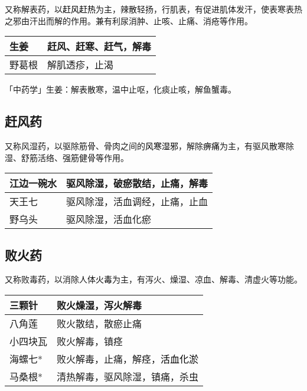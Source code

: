 \documentclass[cn,black,12pt,normal,founder]{elegantnote}
\newcommand{\redt}[1]{\textcolor{black}{{}#1}}      %
\begin{document}
又称解表药，以\redt{赶风赶热}为主，辣散轻扬，行肌表，有促进肌体发汗，使表寒表热之邪由汗出而解的作用。兼有利尿消肿、止咳、止痛、消疮等作用。

\begin{table}[H]
  \begin{tabular}{|l|l|}
  \hline
  生姜 & 赶风、赶寒、赶气，解毒 \\ \hline
  野葛根 & 解肌透疹，止渴     \\ \hline
  \end{tabular}
\end{table}

\begin{note}
  「中药学」生姜：解表散寒，温中止呕，化痰止咳，解鱼蟹毒。
\end{note}

\subsection{赶风药}

又称风湿药，以驱除筋骨、骨肉之间的\redt{风寒湿邪}，解除\redt{痹痛}为主，有驱风散寒除湿、舒筋活络、强筋健骨等作用。

\begin{table}[H]
  \begin{tabular}{|l|l|}
  \hline
  江边一碗水  & 驱风除湿，破瘀散结，止痛，解毒 \\ \hline
  天王七     & 驱风除湿，活血调经，止痛，止血     \\ \hline
  野乌头     & 驱风除湿，活血化瘀               \\ \hline
  \end{tabular}
\end{table}

\subsection{败火药}

又称败毒药，以消除人体\redt{火毒}为主，有泻火、燥湿、凉血、解毒、清虚火等功能。

\begin{table}[H]
  \begin{tabular}{|l|l|}
  \hline
  三颗针    & 败火燥湿，泻火解毒     \\ \hline
  八角莲    & 败火散结，散瘀止痛     \\ \hline
  小四块瓦  & 败火解毒，镇痉         \\ \hline
  海螺七*    & 败火解毒，止痛，解痉，\redt{活血化淤}    \\ \hline
  马桑根*    & 清热解毒，驱风除湿，镇痛，杀虫   \\ \hline
  \end{tabular}
\end{table}
\end{document}
